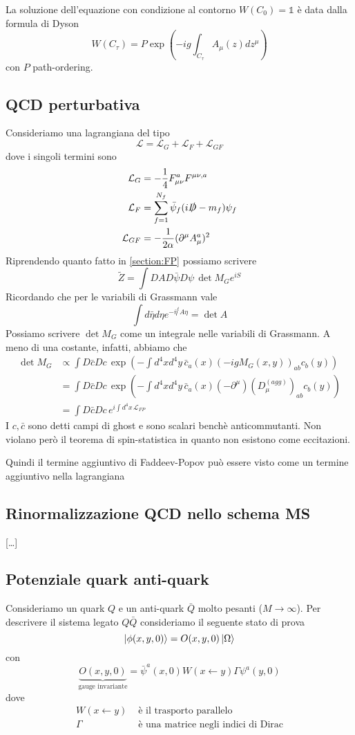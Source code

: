\documentclass[10pt,a4paper]{article}
\theoremstyle{definition}
\newcommand{\lagr}{\mathcal{L}} %
\newcommand{\id}{\mathbb{1}}
\begin{document}
La soluzione dell'equazione con condizione al contorno $W(C_0) = \id$ è data dalla formula di Dyson
\[
W(C_\tau) = P \exp\left(-ig \int_{C_\tau}A_\mu(z)dz^\mu \right)    
\]
con $P$ path-ordering.

\subsection{QCD perturbativa}
Consideriamo una lagrangiana del tipo
\[
\lagr = \lagr_G + \lagr_F + \lagr_{GF}    
\]
dove i singoli termini sono
\begin{align*}
    \lagr_G &= -\frac14 F_{\mu\nu}^aF^{\mu\nu, a} \\
    \lagr_F &= \sum_{f=1}^{N_f} \bar{\psi}_f (i\slashed{D} - m_f)\psi_f \\
    \lagr_{GF} &= -\frac{1}{2\alpha}(\partial^\mu A_\mu^a)^2  
\end{align*}
Riprendendo quanto fatto in \ref{section:FP} possiamo scrivere
\[
\tilde{Z} = \int DA D\bar{\psi}D\psi \, \det M_G e^{iS}    
\]
Ricordando che per le variabili di Grassmann vale
\[
\int d\bar{\eta}d\eta e^{-\bar{\eta}^t A \eta} = \det A    
\]
Possiamo scrivere $\det M_G$ come un integrale nelle variabili di Grassmann. A meno di una costante, infatti, abbiamo che
\begin{align*}
    \det M_G &\propto \int D\bar{c}Dc\, \exp\left(-\int d^4x d^4y\,\bar{c}_a(x)(-ig M_G(x, y))_{ab}c_b(y) \right) \\
    &= \int D\bar{c}Dc\, \exp\left(-\int d^4x d^4y\,\bar{c}_a(x)(-\partial^\mu)(D_\mu^{(agg)})_{ab}c_b(y) \right) \\
    &= \int D\bar{c}Dc\, e^{i\int d^4x\, \lagr_{FP}}
\end{align*}
I $c, \bar{c}$ sono detti campi di ghost e sono scalari benchè anticommutanti. Non violano però il teorema di spin-statistica in quanto non esistono come eccitazioni.

Quindi il termine aggiuntivo di Faddeev-Popov può essere visto come un termine aggiuntivo nella lagrangiana
\subsection{Rinormalizzazione QCD nello schema MS}
[\dots]

\subsection{Potenziale quark anti-quark}
Consideriamo un quark $Q$ e un anti-quark $\bar{Q}$ molto pesanti ($M \to \infty$). Per descrivere il sistema legato $Q\bar{Q}$ consideriamo il seguente stato di prova
\[
\ket{\phi(x, y, 0)} = O(x, y, 0)\ket{\Omega}    
\]
con
\[
\underbrace{O(x, y, 0)}_{\text{gauge invariante}} =  \bar{\psi}^a(x, 0)W(x\leftarrow y)\Gamma\psi^a(y, 0)   
\]
dove
\begin{align*}
    W(x \leftarrow y) &\text{ è il trasporto parallelo} \\
    \Gamma &\text{ è una matrice negli indici di Dirac}
\end{align*}
\end{document}
